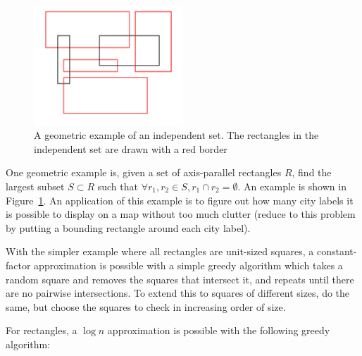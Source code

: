 \documentclass[11pt]{article}
\begin{document}
\begin{figure}[h]
\centering
\includegraphics[width=0.5\textwidth]{RectangleIndySet.png}
\caption{A geometric example of an independent set.  The rectangles in the independent set are drawn with a red border}
\label{fig:RectangleIndySet}
\end{figure}

One geometric example is, given a set of axis-parallel rectangles $R$, find the largest subset $S \subset R$ such that $\forall r_1, r_2 \in S, r_1 \cap r_2 = \emptyset$.  An example is shown in Figure~\ref{fig:RectangleIndySet}.  An application of this example is to figure out how many city labels it is possible to display on a map without too much clutter (reduce to this problem by putting a bounding rectangle around each city label).

With the simpler example where all rectangles are unit-sized squares, a constant-factor approximation is possible with a simple greedy algorithm which takes a random square and removes the squares that intersect it, and repeats until there are no pairwise intersections.  To extend this to squares of different sizes, do the same, but choose the squares to check in increasing order of size.

For rectangles, a $\log n$ approximation is possible with the following greedy algorithm:
\end{document}
